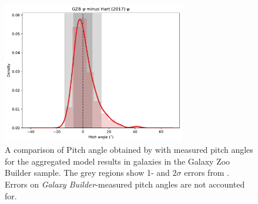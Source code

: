\documentclass[../main.tex]{subfiles}
\begin{document}
\begin{figure}
  \includegraphics[width=8cm]{images__results/gzb-hart-comparison.pdf}
  \caption{A comparison of Pitch angle obtained by \citet{Hart2016:1607.01019v1} with measured pitch angles for the aggregated model results in galaxies in the Galaxy Zoo Builder sample. The grey regions show 1- and $2\sigma$ errors from \citet{Hart2016:1607.01019v1}. Errors on \textit{Galaxy Builder}-measured pitch angles are not accounted for.}
  \label{fig:hart_pitch_angle}
\end{figure}
\end{document}
